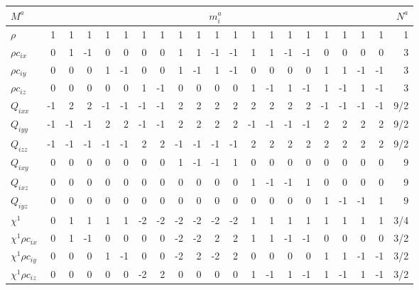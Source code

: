 \begin{table}
\begin{tabular}{|l||r|rrrrrr|rrrr|rrrr|rrrr|r||}
\hline\hline
$M^a$ & \multicolumn{19}{c||}{$m_i^a$} & $N^a$\\
\hline
$\rho $ & 1 &  1 &  1 &  1 &  1 &  1 &  1 & 
         1 &  1 &  1 &   1 &  1 &  1 &  1 & 1 & 1 & 1 & 1 & 1
& 1\\
\hline
$\rho c_{ix}$ & 0 &  1 &  -1 &  0 &  0 &  0 &  0 & 
         1 &  1 &  -1 &   -1 &  1 &  1 &  -1 & -1 & 0 & 0 & 0 & 0
& 3 \\
\hline
$\rho c_{iy}$ & 0 &  0 &  0 &  1 &  -1 &  0 &  0 & 
         1 &  -1 &  1 &   -1 &  0 &  0 &  0 & 0 & 1 & 1 & -1 & -1
& 3\\
\hline
$\rho c_{iz}$ & 0 &  0 &  0 &  0 &  0 &  1 &  -1 & 
         0 &  0 &  0 &   0 &  1 &  -1 &  1 & -1 & 1 & -1 & 1 & -1
& 3\\
\hline
$Q_{ixx}$ & -1 &  2 &  2 &  -1&  -1 &  -1 &  -1 & 
         2 &  2 &  2 &   2 &  2 &  2 &  2 & 2 & -1 & -1 & -1 & -1
& 9/2\\
\hline
$Q_{iyy}$ & -1 &  -1 &  -1 &  2&  2 &  -1 &  -1 & 
         2 &  2 &  2 &   2 &  -1 &  -1 &  -1 & -1 & 2 & 2 & 2 & 2
& 9/2\\
\hline
$Q_{izz}$ & -1 &  -1 &  -1 &  -1&  -1 &  2 &  2 & 
         -1 &  -1 &  -1 &   -1 &  2 &  2 & 2 & 2 & 2 & 2 & 2 & 2
& 9/2\\
\hline
$Q_{ixy}$ & 0 &  0 &  0 &  0&  0 &  0 &  0 & 
          1 &  -1 &  -1 &    1 &  0 &  0 & 0 & 0 & 0 & 0 & 0 & 0
& 9\\
\hline
$Q_{ixz}$ & 0 &  0 &  0 &  0&  0 &  0 &  0 & 
          0 &   0 &   0 &   0 &  1 & -1 & -1 & 1 & 0 & 0 & 0 & 0
& 9\\
\hline
$Q_{iyz}$ & 0 &  0 &  0 &  0&  0 &  0 &  0 & 
          0 &   0 &   0 &   0 &  0 & 0 & 0 & 0 & 1 & -1 & -1 & 1
& 9\\
\hline\hline
$\chi^1$ & 0 &  1 &  1 &  1 &  1 &  -2 &  -2 & 
         -2 &  -2 &  -2 &  -2 &  1 &  1 & 1 & 1 & 1 & 1 & 1 & 1
& 3/4\\
\hline
$\chi^1 \rho c_{ix}$ & 0 &  1 &  -1 &  0&  0 &  0 &  0 & 
         -2 &  -2 &  2 &  2 &  1 &  1 & -1 & -1 & 0 & 0 & 0 & 0
& 3/2\\
\hline
$\chi^1 \rho c_{iy}$ & 0 &  0 &  0 &  1&  -1 &  0 &  0 & 
         -2 &  2 &  -2 &  2 &  0 &  0 & 0 & 0 & 1 & 1 & -1 & -1
& 3/2\\
\hline
$\chi^1 \rho c_{iz}$ & 0 &  0 &  0 &  0&  0 &  -2 &  2 & 
         0 &  0 &  0 &  0 &  1 &  -1 & 1 & -1 & 1 & -1 & 1 & -1
& 3/2\\

\end{tabular}
\end{table}
